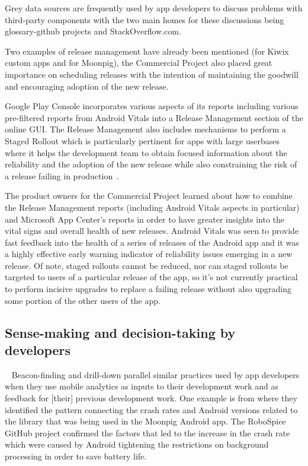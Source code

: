 Grey data sources are frequently used by app developers to discuss problems with third-party components with the two main homes for these discussions being \gls{glossary-github} projects and StackOverflow.com.


Two examples of release management have already been mentioned (for Kiwix custom apps and for Moonpig), the Commercial Project also placed great importance on scheduling releases with the intention of maintaining the goodwill and encouraging adoption of the new release. 

Google Play Console incorporates various aspects of its reports including various pre-filtered reports from Android Vitals into a Release Management section of the online GUI. The Release Management also includes mechanisms to perform a Staged Rollout which is particularly pertinent for apps with large userbases where it helps the development team to obtain focused information about the reliability and the adoption of the new release while also constraining the risk of a release failing in production~. 

The product owners for the Commercial Project learned about how to combine the Release Management reports (including Android Vitals aspects in particular) and Microsoft App Center's reports in order to have greater insights into the vital signs and overall health of new releases. Android Vitals was seen to provide fast feedback into the health of a series of releases of the Android app and it was a highly effective early warning indicator of reliability issues emerging in a new release. Of note, staged rollouts cannot be reduced, nor can staged rollouts be targeted to users of a particular release of the app, so it's not currently practical to perform incisive upgrades to replace a failing release without also upgrading some portion of the other users of the app.

\subsection{Sense-making and decision-taking by developers}~\label{aiu-sensemaking-and-decision-taking-by-developers-section}
Beacon-finding and drill-down parallel similar practices used by app developers when they use mobile analytics as inputs to their development work and as feedback for [their] previous development work. One example is from  where they identified the pattern connecting the crash rates and Android versions related to the  library that was being used in the Moonpig Android app. The RoboSpice GitHub project confirmed the factors that led to the increase in the crash rate which were caused by Android tightening the restrictions on background processing in order to save battery life. 

